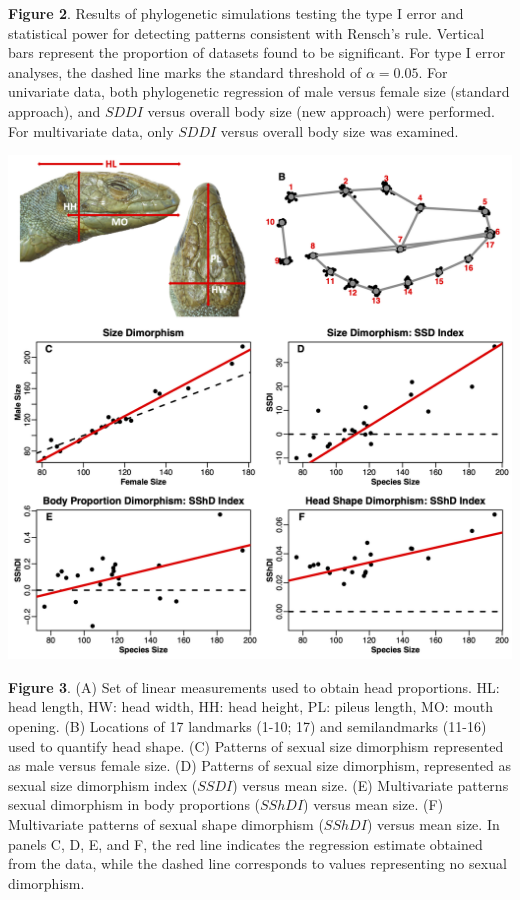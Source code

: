 \documentclass[]{article}
\begin{document}
\singlespacing \textbf{Figure 2}. Results of phylogenetic simulations
testing the type I error and statistical power for detecting patterns
consistent with Rensch's rule. Vertical bars represent the proportion of
datasets found to be significant. For type I error analyses, the dashed
line marks the standard threshold of \(\alpha= 0.05\). For univariate
data, both phylogenetic regression of male versus female size (standard
approach), and \(SDDI\) versus overall body size (new approach) were
performed. For multivariate data, only \(SDDI\) versus overall body size
was examined. \hfill\break

\newpage

\includegraphics[width=0.95\linewidth]{Fig3}

\singlespacing \textbf{Figure 3}. (A) Set of linear measurements used to
obtain head proportions. HL: head length, HW: head width, HH: head
height, PL: pileus length, MO: mouth opening. (B) Locations of 17
landmarks (1-10; 17) and semilandmarks (11-16) used to quantify head
shape. (C) Patterns of sexual size dimorphism represented as male versus
female size. (D) Patterns of sexual size dimorphism, represented as
sexual size dimorphism index (\(SSDI\)) versus mean size. (E)
Multivariate patterns sexual dimorphism in body proportions (\(SShDI\))
versus mean size. (F) Multivariate patterns of sexual shape dimorphism
(\(SShDI\)) versus mean size. In panels C, D, E, and F, the red line
indicates the regression estimate obtained from the data, while the
dashed line corresponds to values representing no sexual dimorphism.
\hfill\break
\end{document}
